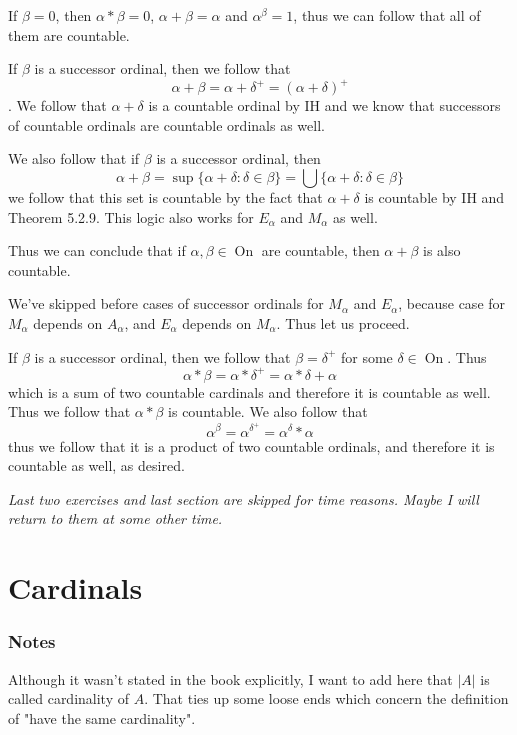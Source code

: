 \documentclass[11pt,oneside,titlepage]{book}
\DeclareMathOperator \On {On}
\newcommand{\set}[1]{\{ #1 \}}
\begin{document}
If $\beta = 0$, then $\alpha * \beta = 0$, $\alpha + \beta = \alpha$ and $\alpha^\beta = 1$,
thus we can follow that all of them are countable.

If $\beta$ is a successor ordinal, then we follow that
$$\alpha + \beta = \alpha + \delta^+ = (\alpha + \delta)^+$$.
We follow that $\alpha + \delta$ is a countable ordinal by IH and we know that
successors of countable ordinals are countable ordinals as well.

We also follow that if $\beta$ is a successor ordinal, then
$$\alpha + \beta = \sup\set{\alpha + \delta: \delta \in \beta} =
\bigcup\set{\alpha + \delta: \delta \in \beta} $$
we follow that this set is countable by the fact that $\alpha + \delta$ is countable
by IH and Theorem 5.2.9. This logic also works for $E_\alpha$ and $M_\alpha$ as well.

Thus we can conclude that if $\alpha, \beta \in \On$ are countable, then $\alpha + \beta$
is also countable.

We've skipped before cases of successor ordinals for $M_\alpha$ and $E_\alpha$,
because case for $M_\alpha$ depends on $A_\alpha$, and $E_\alpha$ depends on $M_\alpha$.
Thus let us proceed. 

If $\beta$ is a successor ordinal, then we follow that $\beta = \delta^+$ for
some $\delta \in \On$. Thus
$$\alpha * \beta = \alpha * \delta^+ = \alpha * \delta + \alpha$$
which is a sum of two countable cardinals and therefore it is countable as well.
Thus we follow that $\alpha * \beta$ is countable.
We also follow that
$$\alpha ^\beta = \alpha^{\delta^+} = \alpha^\delta * \alpha$$
thus we follow that it is a product of two countable ordinals, and therefore it is
countable as well, as desired.

\textit{Last two exercises and last section are skipped for time reasons. Maybe I will
  return to them at some other time.}

\chapter{Cardinals}

\subsection*{Notes}

Although it wasn't stated in the book explicitly, I want to add here that
$|A|$ is called cardinality of $A$. That ties up some loose ends which concern the
definition of "have the same cardinality".
\end{document}
